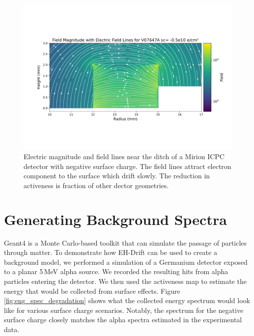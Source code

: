 \begin{figure}%
\centering
\includegraphics[trim={0cm 3cm 0cm 4.69cm},clip,width=0.99\linewidth]{ch5/figs/elect_field_lines_surface_V07647A_sc_-0.5.pdf}
\caption{Electric magnitude and field lines near the ditch of a Mirion ICPC detector with negative surface charge. The field lines attract electron component to the surface which drift slowly. The reduction in activeness is fraction of other dector geometries.}
\label{ch5_fig_elect_field_lines_surface_V07647A}
\end{figure}


\section{\label{res:3} Generating Background Spectra}

Geant4 is a Monte Carlo-based toolkit that can simulate the passage of particles through matter. To demonstrate how EH-Drift can be used to create a background model, we performed a {\geant} simulation of a Germanium detector exposed to a planar 5\,MeV alpha source. We recorded the resulting hits from alpha particles entering the detector. We then used the activeness map to estimate the energy that would be collected from surface effects. Figure \ref{fig:eng_spec_degradation} shows what the collected energy spectrum would look like for various surface charge scenarios. Notably, the spectrum for the negative surface charge closely matches the alpha spectra estimated in the experimental data.

